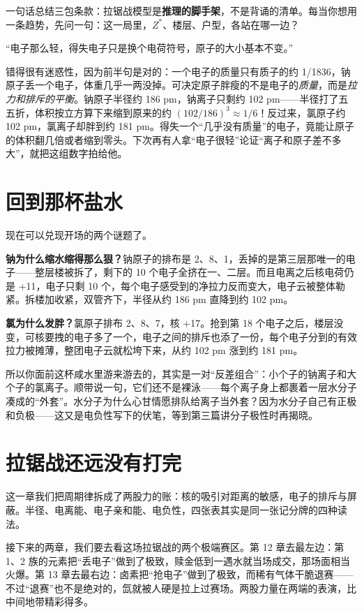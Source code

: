 一句话总结三包条款：拉锯战模型是\textbf{推理的脚手架}，不是背诵的清单。每当你想用一条趋势，先问一句：这一局里，$Z^{*}$、楼层、户型，各站在哪一边？

\begin{wuqu}
“电子那么轻，得失电子只是换个电荷符号，原子的大小基本不变。”

错得很有迷惑性，因为前半句是对的：一个电子的质量只有质子的约 1/1836，钠原子丢一个电子，体重几乎一两没掉。可决定原子胖瘦的不是电子的\emph{质量}，而是\emph{拉力和排斥的平衡}。钠原子半径约 186 pm，钠离子只剩约 102 pm——半径打了五五折，体积按立方算下来缩到原来的约 $(102/186)^3 \approx 1/6$！反过来，氯原子约 102 pm，氯离子却胖到约 181 pm。得失一个“几乎没有质量”的电子，竟能让原子的体积翻几倍或者缩到零头。下次再有人拿“电子很轻”论证“离子和原子差不多大”，就把这组数字拍给他。
\end{wuqu}

\section{回到那杯盐水}

现在可以兑现开场的两个谜题了。

\textbf{钠为什么缩水缩得那么狠？}钠原子的排布是 2、8、1，丢掉的是第三层那唯一的电子——整层楼被拆了，剩下的 10 个电子全挤在一、二层。而且电离之后核电荷仍是 +11，电子只剩 10 个，每个电子感受到的净拉力反而变大，电子云被整体勒紧。拆楼加收紧，双管齐下，半径从约 186 pm 直降到约 102 pm。

\textbf{氯为什么发胖？}氯原子排布 2、8、7，核 +17。抢到第 18 个电子之后，楼层没变，可核要拽的电子多了一个，电子之间的排斥也添了一份，每个电子分到的有效拉力被摊薄，整团电子云就松垮下来，从约 102 pm 涨到约 181 pm。

所以你面前这杯咸水里游来游去的，其实是一对“反差组合”：小个子的钠离子和大个子的氯离子。顺带说一句，它们还不是裸泳——每个离子身上都裹着一层水分子凑成的“外套”。水分子为什么心甘情愿排队给离子当外套？因为水分子自己有正极和负极——这又是电负性写下的伏笔，等到第三篇讲分子极性时再揭晓。

\section{拉锯战还远没有打完}

这一章我们把周期律拆成了两股力的账：核的吸引对距离的敏感，电子的排斥与屏蔽。半径、电离能、电子亲和能、电负性，四张表其实是同一张记分牌的四种读法。

接下来的两章，我们要去看这场拉锯战的两个极端赛区。第 12 章去最左边：第 1、2 族的元素把“丢电子”做到了极致，赎金低到一遇水就当场成交，那场面相当火爆。第 13 章去最右边：卤素把“抢电子”做到了极致，而稀有气体干脆退赛——不过“退赛”也不是绝对的，氙就被人硬是拉上过赛场。两股力量在两端的表演，比中间地带精彩得多。

